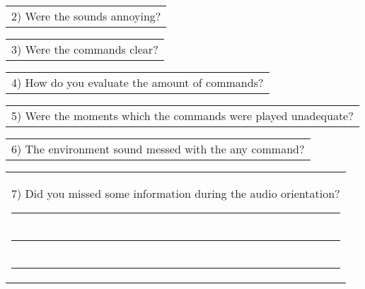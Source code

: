 \begin{table}[!thb]
    \begin{tabular}{m{1\linewidth}}
        \vspace{1ex}
        2)	Were the sounds annoying?
    \end{tabular}

        
        
    
    \begin{tabular}{m{1\linewidth}}
        \vspace{1ex}
        3)	Were the commands clear?
    \end{tabular}

        
        

    \begin{tabular}{m{1\linewidth}}
        \vspace{1ex}
        4)	How do you evaluate the amount of commands?
    \end{tabular}

    
    
    
    \begin{tabular}{m{1\linewidth}}
        \vspace{1ex}
        5)	Were the moments which the commands were played unadequate?
    \end{tabular}

        
        
    
    \begin{tabular}{m{1\linewidth}}
        \vspace{1ex}
        6)	The environment sound messed with the any command?
    \end{tabular}

        
        

    \begin{tabular}{m{1\linewidth}}
        \vspace{1ex}
        7)	Did you missed some information during the audio orientation?

        \noindent
        \rule{6in}{.2mm} \\
        \rule{6in}{.2mm} \\
        \rule{6in}{.2mm}

    \end{tabular}
\end{table}

